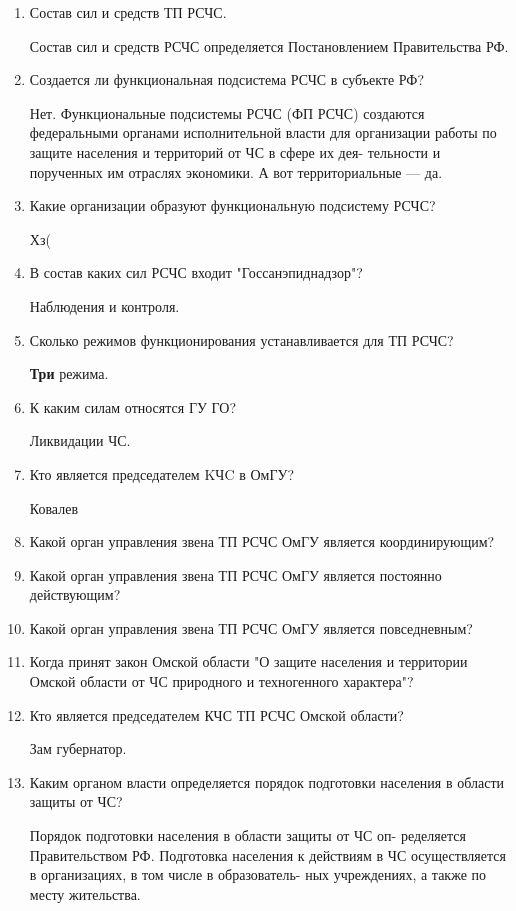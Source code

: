\documentclass[oneside,final,14pt]{extreport}
\begin{document}
\begin{enumerate}
\begin{itemize}
	\end{itemize}
	
	
	\item  Состав сил и средств ТП РСЧС.
	
	Состав сил и средств РСЧС определяется Постановлением
	Правительства РФ.
	
	\item  Создается ли функциональная подсистема РСЧС в субъекте РФ?
	
	Нет. Функциональные подсистемы РСЧС (ФП РСЧС) создаются
	федеральными органами исполнительной власти для организации
	работы по защите населения и территорий от ЧС в сфере их дея-
	тельности и порученных им отраслях экономики. А вот территориальные --- да.
	
	\item Какие организации образуют функциональную подсистему РСЧС?
	
	Хз(
	
	\item  В состав каких сил РСЧС входит "Госсанэпиднадзор"?
	
	Наблюдения и контроля.
	
	\item  Сколько режимов функционирования устанавливается для ТП РСЧС?
	
	\textbf{Три} режима.
	
	\item  К каким силам относятся ГУ ГО?
	
	Ликвидации ЧС.
	
	\item  Кто является председателем KЧC в ОмГУ?
	
	Ковалев
	
	\item  Какой орган управления звена ТП РСЧС ОмГУ является координирующим?
	\item  Какой орган управления звена ТП РСЧС ОмГУ является постоянно действующим?
	\item  Какой орган управления звена ТП РСЧС ОмГУ является повседневным?
	\item  Когда принят закон Омской области "О защите населения и территории Омской области от ЧС природного и техногенного характера"?
	\item  Кто является председателем КЧС ТП РСЧС Омской области?
	
	Зам губернатор.
	
	\item Каким органом власти определяется порядок подготовки населения в области защиты от ЧС?
	
	Порядок подготовки населения в области защиты от ЧС оп-
	ределяется Правительством РФ. Подготовка населения к действиям
	в ЧС осуществляется в организациях, в том числе в образователь-
	ных учреждениях, а также по месту жительства.
	
\end{enumerate}
\end{document}
